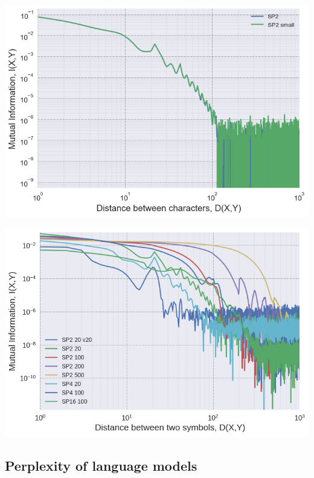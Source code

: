 \documentclass[a0,portrait]{a0poster}
\begin{document}
\begin{multicols}{2}
\begin{center}
\begin{minipage}[b]{0.4\linewidth}
\centering
\includegraphics[width=\textwidth]{spk_size.png}
\label{fig:spk_size}
\end{minipage}
\hspace{0.5cm}
\begin{minipage}[b]{0.4\linewidth}
\centering
\includegraphics[width=\textwidth]{spk_full.png}
\label{fig:spk_full}
\end{minipage}
\end{center}

\color{tudLogoColor}

\subsection*{Perplexity of language models}


\end{multicols}
\end{document}
